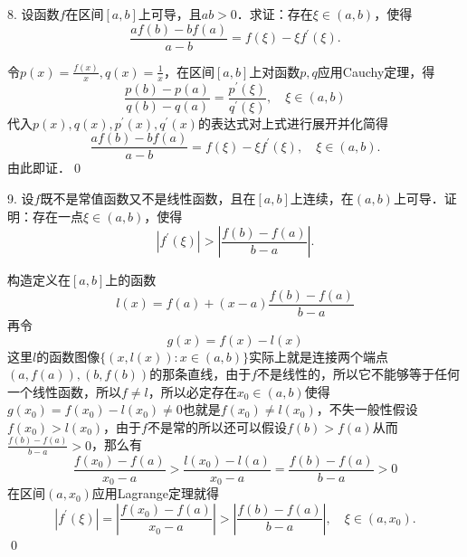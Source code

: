 8. 设函数$f$在区间$[a,b]$上可导，且$ab>0$．求证：存在$\xi \in (a,b)$，使得
\begin{equation*}
    \frac{af(b)-bf(a)}{a-b} = f(\xi) - \xi f^{\prime}(\xi).
\end{equation*}

\prove 令$p(x) = \displaystyle\frac{f(x)}{x}, q(x) = \frac{1}{x}$，在区间$[a,b]$上对函数$p,q$应用Cauchy定理，得
\begin{equation}
    \frac{p(b)-p(a)}{q(b)-q(a)} = \frac{p^{\prime}(\xi)}{q^{\prime}(\xi)}, \quad \xi \in (a,b)
\end{equation}
代入$p(x),q(x),p^\prime (x), q^\prime (x)$的表达式对上式进行展开并化简得
\begin{equation}
    \frac{af(b)-bf(a)}{a-b} = f(\xi) - \xi f^{\prime}(\xi), \quad \xi \in (a,b).
\end{equation}
由此即证．\qed\bigskip

9. 设$f$既不是常值函数又不是线性函数，且在$[a,b]$上连续，在$(a,b)$上可导．证明：存在一点$\xi \in (a,b)$，使得
\begin{equation*}
    \left| f^{\prime}\left(\xi\right) \right| > \left| \frac{f(b)-f(a)}{b-a} \right|.
\end{equation*}

\prove 构造定义在$[a,b]$上的函数
\begin{equation}
    l(x) = f(a) + \left(x-a\right) \frac{f(b)-f(a)}{b-a}
\end{equation}
再令
\begin{equation}
    g(x) = f(x) - l(x)
\end{equation}
这里$l$的函数图像$\{ (x, l(x)) : x \in (a,b) \}$实际上就是连接两个端点$(a,f(a)), (b,f(b))$的那条直线，由于$f$不是线性的，所以它不能够等于任何一个线性函数，所以$f \neq l$，所以必定存在$x_0 \in (a,b)$使得$g(x_0)=f(x_0)-l(x_0) \neq 0$也就是$f(x_0) \neq l(x_0)$，不失一般性假设$f(x_0) > l(x_0)$，由于$f$不是常的所以还可以假设$f(b)>f(a)$从而$\displaystyle\frac{f(b)-f(a)}{b-a}>0$，那么有
\begin{equation}
    \frac{f(x_0)-f(a)}{x_0-a} > \frac{l(x_0)-l(a)}{x_0-a} = \frac{f(b)-f(a)}{b-a} > 0
\end{equation}
在区间$(a,x_0)$应用Lagrange定理就得
\begin{equation}
    \left| f^{\prime}(\xi) \right| = \left| \frac{f(x_0)-f(a)}{x_0-a} \right| > \left| \frac{f(b)-f(a)}{b-a} \right|, \quad \xi \in (a, x_0).
\end{equation}
\qed\bigskip
